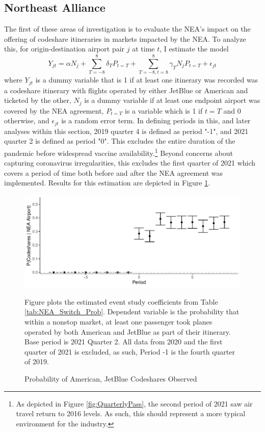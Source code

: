 \documentclass{article}
\begin{document}
	\subsection{Northeast Alliance}
	\label{sec:Analysis_NEA}
	The first of these areas of investigation is to evaluate the NEA's impact on the offering of codeshare itineraries in markets impacted by the NEA.  
    To analyze this, for origin-destination airport pair $j$ at time $t$,  I estimate the model \[Y_{jt} = \alpha N_{j} + \sum_{T = -8}^{8} \delta_{T} P_{t = T} + \sum_{T = -8, t = 8}^{8} \gamma_{T} N_{j} P_{t = T} + \epsilon_{jt}\] where $Y_{jt}$ is a dummy variable that is 1 if at least one itinerary was recorded was a codeshare itinerary with flights operated by either JetBlue or American and ticketed by the other,  $N_{j}$ is a dummy variable if at least one endpoint airport was covered by the NEA agreement, $P_{t = T}$ is a variable which is 1 if $t = T$ and 0 otherwise, and $\epsilon_{jt}$ is a random error term. In defining periods in this, and later analyses within this section, 2019 quarter 4 is defined as period "-1", and 2021 quarter 2 is defined as period "0". This excludes the entire duration of the pandemic before widespread vaccine availability.\footnote{As depicted in Figure \ref{fig:QuarterlyPass}, the second period of 2021 saw air travel return to 2016 levels. As such, this should represent a more typical environment for the industry.} Beyond concerns about capturing coronavirus irregularities, this excludes the first quarter of 2021 which covers a period of time both before and after the NEA agreement was implemented. Results for this estimation are depicted in Figure \ref{fig:NEA_Switch_Graph}. 

    \begin{figure}
		\caption{Probability of American, JetBlue Codeshares Observed}
		\label{fig:NEA_Switch_Graph}
        \begin{center}
        \includegraphics[width =\linewidth]{NEA_Probability_Switches_Graph}

		\footnotesize{Figure plots the estimated event study coefficients from Table \ref{tab:NEA_Switch_Prob}. Dependent variable is the probability that within a nonstop market, at least one passenger took planes operated by both American and JetBlue as part of their itinerary. Base period is 2021 Quarter 2. All data from 2020 and the first quarter of 2021 is excluded, as such,  Period -1 is the fourth quarter of 2019.}
        \end{center}
	\end{figure}
\end{document}
